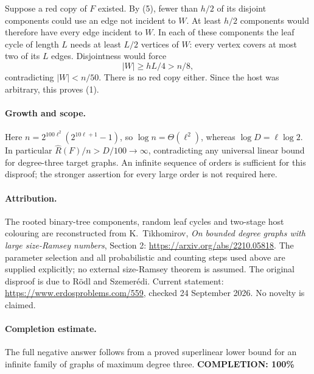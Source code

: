 Suppose a red copy of \(F\) existed. By (5), fewer than \(h/2\)
of its disjoint components could use an edge not incident to \(W\).
At least \(h/2\) components would therefore have every edge incident
to \(W\). In each of these components the leaf cycle of length
\(L\) needs at least \(L/2\) vertices of \(W\): every vertex
covers at most two of its \(L\) edges.
Disjointness would force
\[
 |W|\geq hL/4>n/8,
\]
contradicting \(|W|<n/50\). There is no red copy either.
Since the host was arbitrary, this proves (1).

\paragraph{Growth and scope.}
Here \(n=2^{100\ell^2}(2^{10\ell+1}-1)\), so
\(\log n=\Theta(\ell^2)\), whereas \(\log D=\ell\log2\).
In particular \(\widehat R(F)/n>D/100\to\infty\), contradicting
any universal linear bound for degree-three target graphs.
An infinite sequence of orders is sufficient for this disproof;
the stronger assertion for every large order is not required here.

\paragraph{Attribution.}
The rooted binary-tree components, random leaf cycles and two-stage
host colouring are reconstructed from K.~Tikhomirov,
\emph{On bounded degree graphs with large size-Ramsey numbers},
Section 2: \url{https://arxiv.org/abs/2210.05818}.
The parameter selection and all probabilistic and counting steps
used above are supplied explicitly; no external size-Ramsey theorem
is assumed. The original disproof is due to R\"odl and Szemer\'edi.
Current statement: \url{https://www.erdosproblems.com/559},
checked 24 September 2026. No novelty is claimed.

\paragraph{Completion estimate.}
The full negative answer follows from a proved superlinear lower bound
for an infinite family of graphs of maximum degree three.
\textbf{COMPLETION: 100\%}

